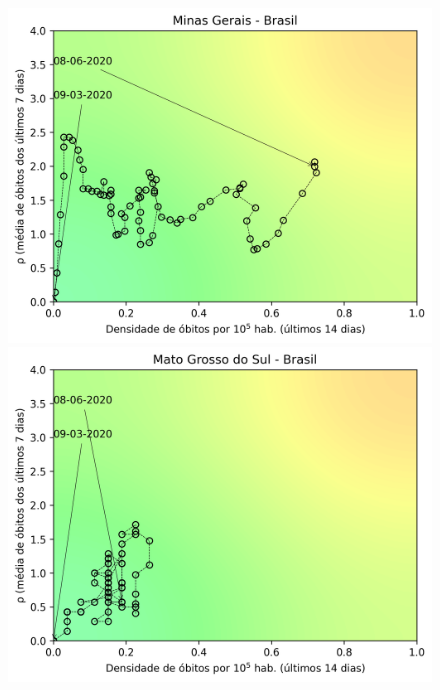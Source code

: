 \documentclass[]{article}
\begin{document}
\begin{figure}[!h]
	\begin{minipage}[t]{4cm}
		\centering
		\includegraphics[scale=0.5]{../MG.png}
	\end{minipage}
	\hspace{5cm}
	\begin{minipage}[t]{4cm}
		\centering
		\includegraphics[scale=0.5]{../MS.png}
		\vspace{0.2cm}
	\end{minipage}
	

\end{figure}
\end{document}
